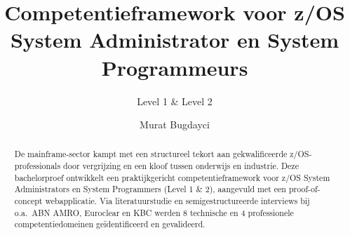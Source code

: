 \documentclass[a0,portrait]{hogent-poster}
\title{Competentieframework voor z/OS System Administrator en System Programmeurs}
\subtitle{Level 1 \& Level 2}
\author{Murat Bugdayci}
\begin{document}
\maketitle

\begin{abstract}
De mainframe-sector kampt met een structureel tekort aan gekwalificeerde z/OS-professionals door vergrijzing en een kloof tussen onderwijs en industrie. Deze bachelorproef ontwikkelt een praktijkgericht competentieframework voor z/OS System Administrators en System Programmers (Level 1 \& 2), aangevuld met een proof-of-concept webapplicatie. Via literatuurstudie en semigestructureerde interviews bij o.a.\ ABN AMRO, Euroclear en KBC werden 8 technische en 4 professionele competentiedomeinen geïdentificeerd en gevalideerd.
\end{abstract}
\end{document}
